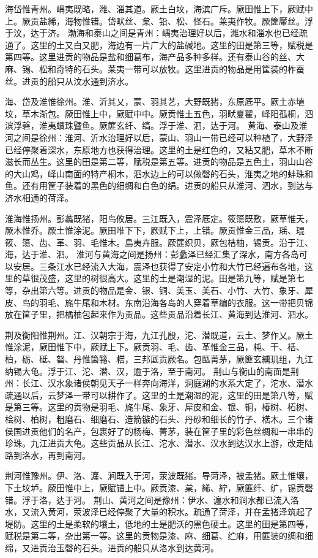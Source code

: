 \documentclass[a4paper,12pt,UTF8,twoside]{ctexbook}
\begin{document}
海岱惟青州。嵎夷既略，潍、淄其道。厥土白坟，海滨广斥。厥田惟上下，厥赋中上。厥贡盐絺，海物惟错。岱畎丝、枲、铅、松、怪石。莱夷作牧。厥篚厴丝。浮于汶，达于济。
渤海和泰山之间是青州：嵎夷治理好以后，潍水和淄水也已经疏通了。这里的土又白又肥，海边有一片广大的盐碱地。这里的田是第三等，赋税是第四等。这里进贡的物品是盐和细葛布，海产品多种多样。还有泰山谷的丝、大麻、锡、松和奇特的石头。莱夷一带可以放牧。这里进贡的物品是用筐装的柞蚕丝。进贡的船只从汶水通到济水。

海、岱及淮惟徐州。淮、沂其乂，蒙、羽其艺，大野既猪，东原厎平。厥土赤埴坟，草木渐包。厥田惟上中，厥赋中中。厥贡惟土五色，羽畎夏翟，峄阳孤桐，泗滨浮磬，淮夷蠙珠暨鱼。厥篚玄纤、缟。浮于淮、泗，达于河。
黄海、泰山及淮河之间是徐州：淮河、沂水治理好以后，蒙山、羽山一带已经可以种植了，大野泽已经停聚着深水，东原地方也获得治理。这里的土是红色的，又粘又肥，草木不断滋长而丛生。这里的田是第二等，赋税是第五等。进贡的物品是五色土，羽山山谷的大山鸡，峄山南面的特产桐木，泗水边上的可以做磬的石头，淮夷之地的蚌珠和鱼。还有用筐子装着的黑色的细绸和白色的绢。进贡的船只从淮河、泗水，到达与济水相通的荷泽。

淮海惟扬州。彭蠡既猪，阳鸟攸居。三江既入，震泽厎定。筱簜既敷，厥草惟夭，厥木惟乔。厥土惟涂泥。厥田唯下下，厥赋下上，上错。厥贡惟金三品，瑶、琨筱、簜、齿、革、羽、毛惟木。島夷卉服。厥篚织贝，厥包桔柚，锡贡。沿于江、海，达于淮、泗。
淮河与黄海之间是扬州：彭蠡泽已经汇集了深水，南方各岛可以安居。三条江水已经流入大海，震泽也获得了安定小竹和大竹已经遍布各地，这里的草很茂盛，这里的树很高大。这里的土是潮湿的泥。田是第九等，赋是第七等，杂出第六等。进贡的物品是金、银、铜、美玉、美石、小竹、大竹、象牙、犀皮、鸟的羽毛、旄牛尾和木材。东南沿海各岛的人穿着草编的衣服。这一带把贝锦放在筐子里，把橘柚包起来作为贡品。这些贡品沿着长江、黄海到达淮河、泗水。

荆及衡阳惟荆州。江、汉朝宗于海，九江孔殷，沱、潜既道，云土、梦作乂。厥土惟涂泥，厥田惟下中，厥赋上下。厥贡羽、毛、齿、革惟金三品，杶、干、栝、柏，砺、砥、砮、丹惟箘簵、楛，三邦厎贡厥名。包匦菁茅，厥篚玄纁玑组，九江纳锡大龟。浮于江、沱、潜、汉，逾于洛，至于南河。
荆山与衡山的南面是荆州：长江、汉水象诸侯朝见天子一样奔向海洋，洞庭湖的水系大定了，沱水、潜水疏通以后，云梦泽一带可以耕作了。这里的土是潮湿的泥，这里的田是第八等，赋是第三等。这里的贡物是羽毛、旄牛尾、象牙、犀皮和金、银、铜，椿树、柘树、桧树、柏树，粗磨石、细磨石、造箭镞的石头、丹砂和细长的竹子、楛木。三个诸侯国进贡他们的名产，包裹好了的杨梅、菁茅，装在筐子里的彩色丝绸和一串串的珍珠。九江进贡大龟。这些贡品从长江、沱水、潜水、汉水到达汉水上游，改走陆路到洛水，再到南河。

荆河惟豫州。伊、洛、瀍、涧既入于河，荥波既猪。导菏泽，被孟猪。厥土惟壤，下土坟垆。厥田惟中上，厥赋错上中。厥贡漆、枲，絺、紵，厥篚纤、纩，锡贡磬错。浮于洛，达于河。
荆山、黄河之间是豫州：伊水、瀍水和涧水都已流入洛水，又流入黄河，荥波泽已经停聚了大量的积水。疏通了菏泽，并在孟猪泽筑起了堤防。这里的土是柔软的壤土，低地的土是肥沃的黑色硬土。这里的田是第四等，赋税是第二等，杂出第一等。这里的贡物是漆、麻、细葛、纻麻，用篚装的绸和细绵，又进贡治玉磬的石头。进贡的船只从洛水到达黄河。
\end{document}
